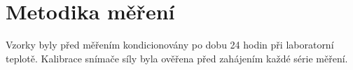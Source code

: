 \section{Metodika měření}

Vzorky byly před měřením kondicionovány po dobu 24 hodin při laboratorní teplotě.
Kalibrace snímače síly byla ověřena před zahájením každé série měření.
